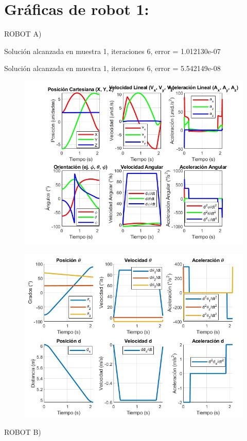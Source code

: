 \section{Gráficas de robot 1:}
\vspace{10mm}

ROBOT A)
\vspace{10mm}

 Solución alcanzada en muestra 1, iteraciones 6, error = 1.012130e-07

 Solución alcanzada en muestra 1, iteraciones 6, error = 5.542149e-08

\vspace{10mm}

\begin{figure}[h]
	\centering
	\includegraphics[width=0.55\linewidth]{img/R1}
	\caption{}
	\label{fig}
\end{figure}

\begin{figure}[h]
	\centering
	\includegraphics[width=0.55\linewidth]{img/R1 2}
	\caption{}
	\label{fig}
\end{figure}

\vspace{5mm}

\newpage  %
\vspace{10mm}

ROBOT B)
\vspace{10mm}

